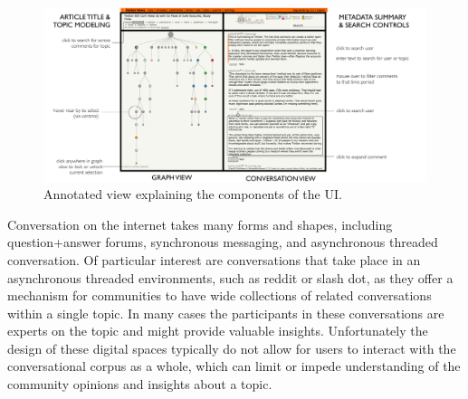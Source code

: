 \documentclass{egpubl}
\begin{document}
\begin{figure}[htb]
\centering
\includegraphics[width=\linewidth]{images/explainer.pdf}
%
%
\caption{
\label{fig:explainer}
Annotated view explaining the components of the UI.
}
\end{figure}


Conversation on the internet takes many forms and shapes, including question+answer forums, synchronous messaging, and asynchronous threaded conversation. Of particular interest are conversations that take place in an asynchronous threaded environments, such as reddit or slash dot, as they offer a mechanism for communities to have wide collections of related conversations within a single topic. In many cases the participants in these conversations are experts on the topic and might provide valuable insights. Unfortunately the design of these digital spaces typically do not allow for users to interact with the conversational corpus as a whole, which can limit or impede understanding of the community opinions and insights about a topic.
\end{document}
